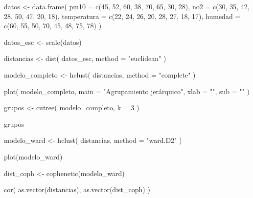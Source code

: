 \documentclass[
  spanish,
  10.5pt,
  letterpaper,
  DIV=11,
  numbers=noendperiod,
  oneside,
  open=any]{scrreprt}
\newenvironment{Shaded}{\begin{snugshade}}{\end{snugshade}}
\newcommand{\AttributeTok}[1]{\textcolor[rgb]{0.40,0.45,0.13}{#1}}
\newcommand{\DecValTok}[1]{\textcolor[rgb]{0.68,0.00,0.00}{#1}}
\newcommand{\FunctionTok}[1]{\textcolor[rgb]{0.28,0.35,0.67}{#1}}
\newcommand{\NormalTok}[1]{\textcolor[rgb]{0.00,0.23,0.31}{#1}}
\newcommand{\OtherTok}[1]{\textcolor[rgb]{0.00,0.23,0.31}{#1}}
\newcommand{\StringTok}[1]{\textcolor[rgb]{0.13,0.47,0.30}{#1}}
\theoremstyle{definition}
\theoremstyle{definition}
\theoremstyle{plain}
\theoremstyle{remark}
\begin{document}
\begin{Shaded}
\begin{Highlighting}[numbers=left,,]
\NormalTok{datos }\OtherTok{\textless{}{-}} \FunctionTok{data.frame}\NormalTok{(}
  \AttributeTok{pm10 =} \FunctionTok{c}\NormalTok{(}\DecValTok{45}\NormalTok{, }\DecValTok{52}\NormalTok{, }\DecValTok{60}\NormalTok{, }\DecValTok{38}\NormalTok{, }\DecValTok{70}\NormalTok{, }\DecValTok{65}\NormalTok{, }\DecValTok{30}\NormalTok{, }\DecValTok{28}\NormalTok{),}
  \AttributeTok{no2 =} \FunctionTok{c}\NormalTok{(}\DecValTok{30}\NormalTok{, }\DecValTok{35}\NormalTok{, }\DecValTok{42}\NormalTok{, }\DecValTok{28}\NormalTok{, }\DecValTok{50}\NormalTok{, }\DecValTok{47}\NormalTok{, }\DecValTok{20}\NormalTok{, }\DecValTok{18}\NormalTok{),}
  \AttributeTok{temperatura =} \FunctionTok{c}\NormalTok{(}\DecValTok{22}\NormalTok{, }\DecValTok{24}\NormalTok{, }\DecValTok{26}\NormalTok{, }\DecValTok{20}\NormalTok{, }\DecValTok{28}\NormalTok{, }\DecValTok{27}\NormalTok{, }\DecValTok{18}\NormalTok{, }\DecValTok{17}\NormalTok{),}
  \AttributeTok{humedad =} \FunctionTok{c}\NormalTok{(}\DecValTok{60}\NormalTok{, }\DecValTok{55}\NormalTok{, }\DecValTok{50}\NormalTok{, }\DecValTok{70}\NormalTok{, }\DecValTok{45}\NormalTok{, }\DecValTok{48}\NormalTok{, }\DecValTok{75}\NormalTok{, }\DecValTok{78}\NormalTok{)}
\NormalTok{)}

\NormalTok{datos\_esc }\OtherTok{\textless{}{-}} \FunctionTok{scale}\NormalTok{(datos)}

\NormalTok{distancias }\OtherTok{\textless{}{-}} \FunctionTok{dist}\NormalTok{(}
\NormalTok{  datos\_esc,}
  \AttributeTok{method =} \StringTok{"euclidean"}
\NormalTok{)}

\NormalTok{modelo\_completo }\OtherTok{\textless{}{-}} \FunctionTok{hclust}\NormalTok{(}
\NormalTok{  distancias,}
  \AttributeTok{method =} \StringTok{"complete"}
\NormalTok{)}

\FunctionTok{plot}\NormalTok{(}
\NormalTok{  modelo\_completo,}
  \AttributeTok{main =} \StringTok{"Agrupamiento jerárquico"}\NormalTok{,}
  \AttributeTok{xlab =} \StringTok{""}\NormalTok{,}
  \AttributeTok{sub =} \StringTok{""}
\NormalTok{)}

\NormalTok{grupos }\OtherTok{\textless{}{-}} \FunctionTok{cutree}\NormalTok{(}
\NormalTok{  modelo\_completo,}
  \AttributeTok{k =} \DecValTok{3}
\NormalTok{)}

\NormalTok{grupos}

\NormalTok{modelo\_ward }\OtherTok{\textless{}{-}} \FunctionTok{hclust}\NormalTok{(}
\NormalTok{  distancias,}
  \AttributeTok{method =} \StringTok{"ward.D2"}
\NormalTok{)}

\FunctionTok{plot}\NormalTok{(modelo\_ward)}

\NormalTok{dist\_coph }\OtherTok{\textless{}{-}} \FunctionTok{cophenetic}\NormalTok{(modelo\_ward)}

\FunctionTok{cor}\NormalTok{(}
  \FunctionTok{as.vector}\NormalTok{(distancias),}
  \FunctionTok{as.vector}\NormalTok{(dist\_coph)}
\NormalTok{)}
\end{Highlighting}
\end{Shaded}
\end{document}
